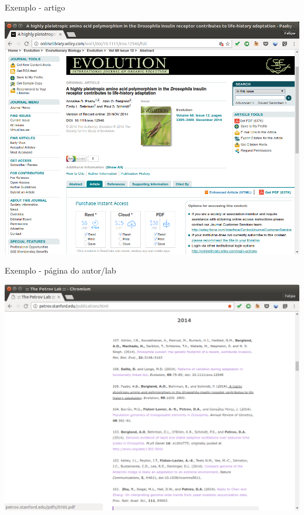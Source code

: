 \documentclass{beamer}
\begin{document}
\begin{frame}{Exemplo - artigo}
  \begin{center}
    \includegraphics[height=.9\textheight]{Busca/petrov1}
  \end{center}
\end{frame}

\begin{frame}{Exemplo - página do autor/lab}
  \begin{center}
    \includegraphics[height=.9\textheight]{Busca/petrov2}
  \end{center}
\end{frame}
\end{document}
